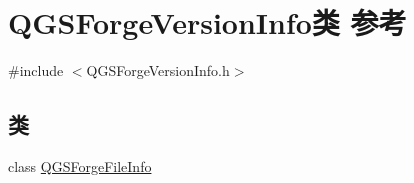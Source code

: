 \hypertarget{class_q_g_s_forge_version_info}{}\section{Q\+G\+S\+Forge\+Version\+Info类 参考}
\label{class_q_g_s_forge_version_info}


{\ttfamily \#include $<$Q\+G\+S\+Forge\+Version\+Info.\+h$>$}

\subsection*{类}
\begin{DoxyCompactItemize}
\item 
class \mbox{\hyperlink{class_q_g_s_forge_version_info_1_1_q_g_s_forge_file_info}{Q\+G\+S\+Forge\+File\+Info}}
\end{DoxyCompactItemize}
